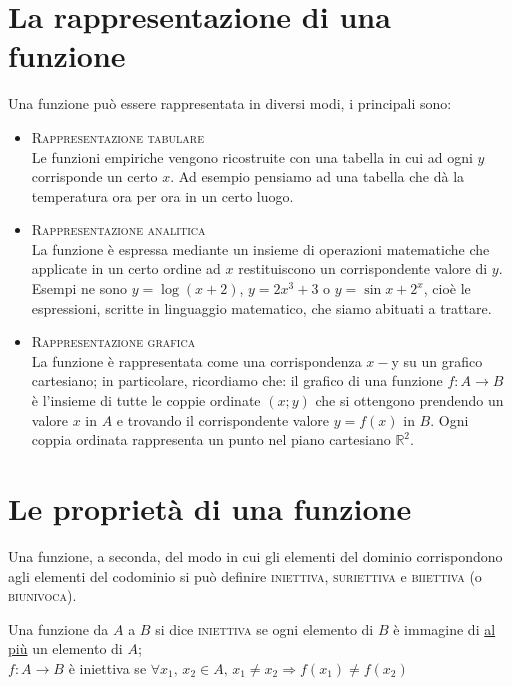 \section{La rappresentazione di una funzione}
Una funzione può essere rappresentata in diversi modi, i principali sono:
\begin{itemize}
  \item \textsc{Rappresentazione tabulare}\\
Le funzioni empiriche vengono ricostruite con una tabella in cui ad ogni \(y\) 
corrisponde un certo \(x\). Ad esempio pensiamo ad una tabella che dà la 
temperatura ora per ora in un certo luogo.
%
  \item \textsc{Rappresentazione analitica}\\
La funzione è espressa mediante un insieme di operazioni matematiche che 
applicate in un certo ordine ad \(x\) restituiscono un corrispondente valore di 
\(y\). Esempi ne sono \(y=\log{(x+2)}\), \(y=2x^3+3\) o \(y=\sin{x}+2^x\), cioè le 
espressioni, scritte in linguaggio matematico, che siamo abituati a trattare.
%
  \item \textsc{Rappresentazione grafica}\\
La funzione è rappresentata come una corrispondenza \(x-\)y su un grafico 
cartesiano; in particolare, ricordiamo che: il grafico di una funzione \(f 
:A\to B\) è l'insieme di tutte le coppie ordinate \((x;y)\) che si ottengono 
prendendo un valore \(x\) in \(A\) e trovando il corrispondente valore \(y=f(x)\) 
in \(B\). Ogni coppia ordinata rappresenta un punto nel piano cartesiano 
\(\mathbb{R}^2\).
\end{itemize}

\section{Le proprietà di una funzione}
Una funzione, a seconda, del modo in cui gli elementi del dominio 
corrispondono agli elementi del codominio si può definire \textsc{iniettiva}, 
\textsc{suriettiva} e \textsc{biiettiva} (o \textsc{biunivoca}).\\

\begin{definizione}
Una funzione da \(A\) a \(B\) si dice \textsc{iniettiva} se ogni elemento di \(B\) 
è immagine di \underline{al più} un elemento di \(A\);\\


\(f : A\to B\) è iniettiva se  \(\forall x_1,\,x_2\in A ,\,x_1\neq 
x_2\Rightarrow f(x_1 )\neq f(x_2)\)
\end{definizione}

